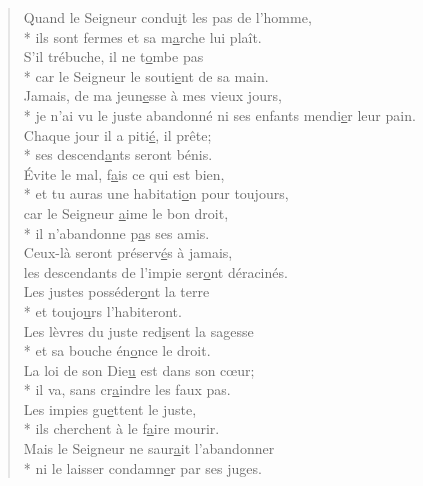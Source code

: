 \begin{verse}
Quand le Seigneur condu\underline{i}t les pas de l’homme, \\*
ils sont fermes et sa m\underline{a}rche lui plaît. \\
S’il trébuche, il ne t\underline{o}mbe pas \\*
car le Seigneur le souti\underline{e}nt de sa main. \\

Jamais, de ma jeun\underline{e}sse à mes vieux jours, \\*
je n’ai vu le juste abandonné
ni ses enfants mendi\underline{e}r leur pain. \\
Chaque jour il a piti\underline{é}, il prête; \\*
ses descend\underline{a}nts seront bénis. \\

Évite le mal, f\underline{a}is ce qui est bien, \\*
et tu auras une habitati\underline{o}n pour toujours, \\
car le Seigneur \underline{a}ime le bon droit, \\*
il n’abandonne p\underline{a}s ses amis. \\

Ceux-là seront préserv\underline{é}s à jamais, \\
les descendants de l’impie ser\underline{o}nt déracinés. \\
Les justes posséder\underline{o}nt la terre \\*
et toujo\underline{u}rs l’habiteront. \\

Les lèvres du juste red\underline{i}sent la sagesse \\*
et sa bouche én\underline{o}nce le droit. \\
La loi de son Die\underline{u} est dans son cœur; \\*
il va, sans cr\underline{a}indre les faux pas. \\

Les impies gu\underline{e}ttent le juste, \\*
ils cherchent à le f\underline{a}ire mourir. \\
Mais le Seigneur ne saur\underline{a}it l’abandonner \\*
ni le laisser condamn\underline{e}r par ses juges. \\


\end{verse}
